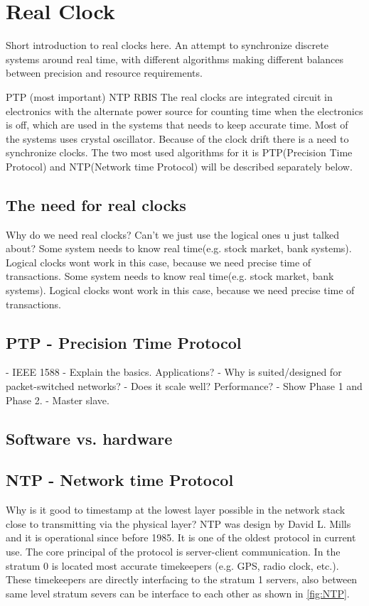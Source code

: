 \section{Real Clock}\label{sc:realClock}

Short introduction to real clocks here.
An attempt to synchronize discrete systems around real time, with different algorithms making different balances between precision and resource requirements.

PTP (most important)
NTP
RBIS
The real clocks are integrated circuit in electronics with the alternate power source for counting time when the electronics is off, which are used in the systems that needs to keep accurate time. Most of the systems uses crystal oscillator. Because of the clock drift there is a need to synchronize clocks. The two most used algorithms for it is PTP(Precision Time Protocol) and NTP(Network time Protocol) will be described separately below.

\subsection{The need for real clocks}

Why do we need real clocks? Can't we just use the logical ones u just talked about?
Some system needs to know real time(e.g. stock market, bank systems). Logical clocks wont work in this case, because we need precise time of transactions.
Some system needs to know real time(e.g. stock market, bank systems). Logical clocks wont work in this
case, because we need precise time of transactions.


\subsection{PTP - Precision Time Protocol}

- IEEE 1588
- Explain the basics. Applications?
- Why is suited/designed for packet-switched networks?
- Does it scale well? Performance?
- Show Phase 1 and Phase 2.
- Master slave.

\subsection{Software vs. hardware}
\subsection{NTP - Network time Protocol}

Why is it good to timestamp at the lowest layer possible in the network stack close to transmitting via the physical layer?
NTP was design by David L. Mills and it is operational since before 1985. It is one of the oldest protocol in
current use. The core principal of the protocol is server-client communication. In the stratum 0 is located
most accurate timekeepers (e.g. GPS, radio clock, etc.). These timekeepers are directly interfacing to the
stratum 1 servers, also between same level stratum severs can be interface to each other as shown in \ref{fig:NTP}.

